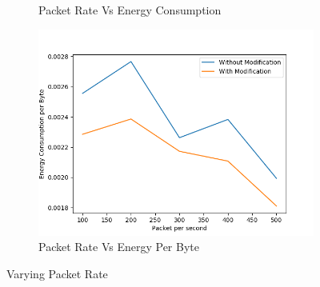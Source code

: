 \begin{figure}[h]
\begin{subfigure}{.5\textwidth}
     \caption{Packet Rate Vs Energy Consumption}
     \label{packet_rate_energy_modified}
\end{subfigure}
\begin{subfigure}{.5\textwidth}
  \centering
  \includegraphics[width=.8\linewidth]{modified_fig/PacketpersecondvsEnergyConsumptionperByte.png}
     \caption{Packet Rate Vs Energy Per Byte}
     \label{packet_rate_energy_modified_per_byte}
\end{subfigure}
\caption{Varying Packet Rate}
\label{fig:varyingPacketRate}
\end{figure}

